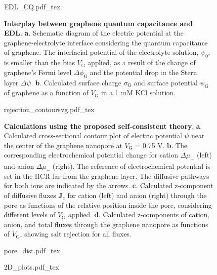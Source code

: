 \begin{figure}[H]
  \centering
  {EDL_CQ.pdf_tex}
  \caption{\textbf{Interplay between graphene quantum capacitance and
      EDL.} \textbf{a}. Schematic diagram of the electric
    potential at the graphene-electrolyte interface considering the
    quantum capacitance of graphene. The interfacial potential of the
    electrolyte solution, $\psi_{0}$, is smaller than the bias
    $V_{\mathrm{G}}$ applied, as a result of the change of graphene's
    Fermi level $\Delta \phi_{\mathrm{G}}$ and the potential drop in
    the Stern layer $\Delta \psi$. \textbf{b}. Calculated surface
    charge $\sigma_{\mathrm{G}}$ and surface potential
    $\psi_{\mathrm{G}}$ of graphene as a function of $V_{\mathrm{G}}$
    in a 1 mM KCl solution. }
  \label{fig:np-3}
\end{figure}

\begin{figure}[H]
  \centering
  {rejection_contoursvg.pdf_tex}
  \caption{\textbf{Calculations using the proposed self-consistent
      theory}. \textbf{a}. Calculated cross-sectional contour plot of
    electric potential $\psi$ near the center of the graphene
    nanopore at $V_{\mathrm{G}}$ = 0.75 V. \textbf{b}. The
    corresponding electrochemical potential change for cation
    $\Delta \mu_{+}$ (left) and anion $\Delta \mu_{-}$ (right). The
    reference of electrochemical potential is set in the HCR far from
    the graphene layer. The diffusive pathways for both ions are
    indicated by the arrows. \textbf{c}. Calculated z-component of
    diffusive fluxes $\symbf{J}_{z}$ for cation (left) and anion
    (right) through the pore as functions of the relative position
    inside the pore, considering different levels of $V_{\mathrm{G}}$
    applied. \textbf{d}. Calculated z-components of cation, anion, and
    total fluxes through the graphene nanopore as functions of
    $V_{\mathrm{G}}$, showing salt rejection for all fluxes.}
  \label{fig:np-4}
\end{figure}

\begin{figure}[!htbp]
  {pore_dist.pdf_tex}
\end{figure}

\begin{figure}[!htbp]
  {2D_plots.pdf_tex}
\end{figure}


